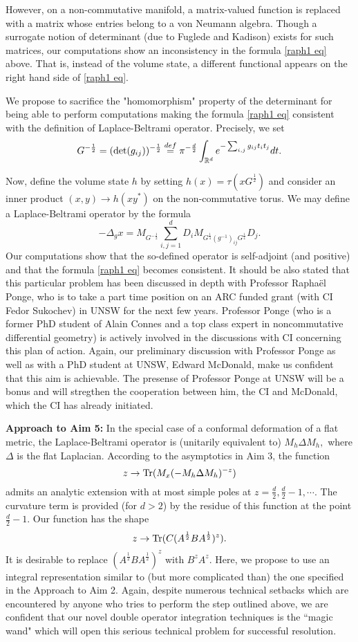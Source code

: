 \documentclass[12pt]{article}
\begin{document}
However, on a non-commutative manifold, a matrix-valued function is replaced with a matrix whose entries belong to a von Neumann algebra. Though a surrogate notion of determinant (due to Fuglede and Kadison) exists for such matrices, our computations show an inconsistency in the formula \eqref{raph1 eq} above. That is, instead of the volume state, a different functional appears on the right hand side of \eqref{raph1 eq}.

We propose to sacrifice the "homomorphism" property of the determinant for being able to perform computations making the formula \eqref{raph1 eq} consistent with the definition of Laplace-Beltrami operator. Precisely, we set 
$$G^{-\frac12}=({\rm det}(g_{ij}))^{-\frac12}\stackrel{def}{=}\pi^{-\frac{d}{2}}\int_{\mathbb{R}^d}e^{-\sum_{i,j}g_{ij}t_it_j}dt.$$

Now, define the volume state $h$ by setting $h(x)=\tau(xG^{\frac12})$ and consider an inner product $(x,y)\to h(xy^*)$ on the non-commutative torus. We may define a Laplace-Beltrami operator by the formula
$$-\Delta_g x=M_{G^{-\frac12}}\sum_{i,j=1}^dD_iM_{G^{\frac14}(g^{-1})_{ij}G^{\frac14}}D_j.$$
Our computations show that the so-defined operator is self-adjoint (and positive) and that the formula \eqref{raph1 eq} becomes consistent. It should be also stated that this particular problem has been discussed in depth with Professor Rapha\"el Ponge, who is to take a part time position on an ARC funded grant (with CI Fedor Sukochev) in UNSW for the next few years. Professor Ponge (who is a former PhD student of Alain Connes and a top class expert in noncommutative differential geometry) is actively involved in the discussions with CI concerning this plan of action. Again, our preliminary discussion with Professor Ponge as well as with a PhD student at UNSW, Edward McDonald, make us confident that this aim is achievable. The presense of Professor Ponge at UNSW will be a bonus and will stregthen the cooperation between him, the CI and McDonald, which the CI has already initiated.

{\bf Approach to Aim 5:} In the special case of a conformal deformation of a flat metric, the Laplace-Beltrami operator is (unitarily equivalent to) $M_h\Delta M_h,$ where $\Delta$ is the flat Laplacian. According to the asymptotics in Aim 3, the function
$$z\to {\rm Tr}(M_x(-M_h\Delta M_h)^{-z})$$
admits an analytic extension with at most simple poles at $z=\frac{d}{2},\frac{d}{2}-1,\cdots.$ The curvature term is provided (for $d>2$) by the residue of this function at the point $\frac{d}{2}-1.$ Our function has the shape
$$z\to {\rm Tr}(C(A^{\frac12}BA^{\frac12})^z).$$
It is desirable to replace $(A^{\frac12}BA^{\frac12})^z$ with $B^zA^z.$ Here, we propose to use an integral representation similar to (but more complicated than) the one specified in  the Approach to Aim 2. Again, despite numerous technical setbacks which are encountered by anyone who tries to perform the step outlined above, we are confident that our novel double operator integration techniques is the ``magic wand" which will open this serious technical problem for successful resolution.
\end{document}
